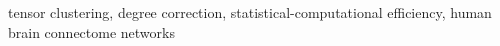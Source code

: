 \documentclass[lettersize,onecolumn,journal]{IEEEtran}
\theoremstyle{definition}
\theoremstyle{definition}
\providecommand{\DIFdelbegin}{} %
\newcommand{\DIFscaledelfig}{0.5}
\newlength{\DIFdelgraphicswidth} %
\newlength{\DIFdelgraphicsheight} %
\newcommand{\DIFdelincludegraphics}[2][]{%
\sbox{\DIFdelgraphicsbox}{\DIFOincludegraphics[#1]{#2}}%
\settoboxwidth{\DIFdelgraphicswidth}{\DIFdelgraphicsbox} %
\settoboxtotalheight{\DIFdelgraphicsheight}{\DIFdelgraphicsbox} %
\scalebox{\DIFscaledelfig}{%
\parbox[b]{\DIFdelgraphicswidth}{\usebox{\DIFdelgraphicsbox}\\[-\baselineskip] \rule{\DIFdelgraphicswidth}{0em}}\llap{\resizebox{\DIFdelgraphicswidth}{\DIFdelgraphicsheight}{%
\setlength{\unitlength}{\DIFdelgraphicswidth}%
\begin{picture}(1,1)%
\thicklines\linethickness{2pt} %
{\color[rgb]{1,0,0}\put(0,0){\framebox(1,1){}}}%
{\color[rgb]{1,0,0}\put(0,0){\line( 1,1){1}}}%
{\color[rgb]{1,0,0}\put(0,1){\line(1,-1){1}}}%
\end{picture}%
}\hspace*{3pt}}} %
} %
\DeclareRobustCommand{\DIFdelbegin}{\DIFOdelbegin \let\includegraphics\DIFdelincludegraphics} %
\begin{document}
\begin{IEEEkeywords}
tensor clustering, degree correction, statistical-computational efficiency, human brain connectome networks
\end{IEEEkeywords}




\DIFdelbegin %






\end{document}
